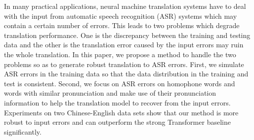 In many practical applications, neural machine translation systems have to deal with the input from automatic speech recognition (ASR) systems which may contain a certain number of errors. This leads to two problems which degrade translation performance. One is the discrepancy between the training and testing data and the other is the translation error caused by the input errors may ruin the whole translation. In this paper, we propose a method to handle the two problems so as to generate robust translation to ASR errors. First, we simulate ASR errors in the training data so that the data distribution in the training and test is consistent. Second, we focus on ASR errors on homophone words and words with similar pronunciation and make use of their pronunciation information to help the translation model to recover from the input errors. Experiments on two Chinese-English data sets show that our method is more robust to input errors and can outperform the strong Transformer baseline significantly.
